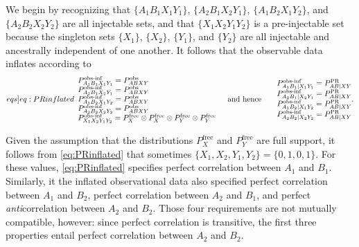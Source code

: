 We begin by recognizing that $\{A_1 B_1 X_1 Y_1\}$, $\{A_2 B_1 X_2 Y_1\}$, $\{A_1 B_2 X_1 Y_2\}$, and $\{A_2 B_2 X_2 Y_2\}$ are all injectable sets, and that $\{X_1 X_2 Y_1 Y_2\}$ is a pre-injectable set because the singleton sets $\{X_1\}$, $\{X_2\}$, $\{Y_1\}$, and $\{Y_2\}$ are all injectable and ancestrally independent of one another.  It follows that the observable data inflates according to
\begin{align}\begin{split}\label[eqs]{eq:PRinflated}\begin{array}{l}
P^{\text{obs-inf}}_{A_1 B_1 X_1 Y_1}=P^{\text{obs}}_{A B X Y}\\%
P^{\text{obs-inf}}_{A_2 B_1 X_2 Y_1}=P^{\text{obs}}_{A B X Y}\\%
P^{\text{obs-inf}}_{A_1 B_2 X_1 Y_2}=P^{\text{obs}}_{A B X Y}\\%
P^{\text{obs-inf}}_{A_2 B_2 X_2 Y_2}=P^{\text{obs}}_{A B X Y}\\%
P^{\text{obs-inf}}_{X_1 X_2 Y_1 Y_2}=P^{\text{free}}_X \otimes P^{\text{free}}_X \otimes P^{\text{free}}_Y \otimes P^{\text{free}}_Y%
\end{array}\quad\text{and hence}\quad\begin{matrix}
&P^{\text{obs-inf}}_{A_1 B_1 |X_1 Y_1}=P^{\text{PR}}_{A B |X Y}\\%
&P^{\text{obs-inf}}_{A_2 B_1 |X_2 Y_1}=P^{\text{PR}}_{A B |X Y}\\%
&P^{\text{obs-inf}}_{A_1 B_2 |X_1 Y_2}=P^{\text{PR}}_{A B |X Y}\\%
&P^{\text{obs-inf}}_{A_2 B_2 |X_2 Y_2}=P^{\text{PR}}_{A B |X Y}%
\end{matrix}.\end{split}\end{align}

Given the assumption that the distributions $P^{\text{free}}_{X}$ and $P^{\text{free}}_{Y}$ are full support, it follows from \cref{eq:PRinflated} that sometimes $\{X_1, X_2, Y_1, Y_2\}=\{0, 1, 0, 1\}$.  
For these values, \cref{eq:PRinflated} specifies perfect correlation between $A_1$ and $B_1$.  Similarly, it the inflated observational data also specified perfect correlation between $A_1$ and $B_2$, perfect correlation between $A_2$ and $B_1$, and perfect \emph{anti}correlation between $A_2$ and $B_2$. Those four requirements are not mutually compatible, however: since perfect correlation is transitive, the first three properties entail perfect correlation between $A_2$ and $B_2$. 

